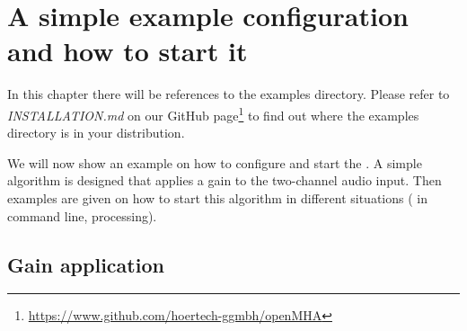 
\section{A simple example configuration and how to start it}%
\label{sec:scenarios}%
%
%
%
In this chapter there will be references to the \mha{} examples directory.
Please refer to \emph{INSTALLATION.md} on our GitHub page\footnote{\url{https://www.github.com/hoertech-ggmbh/openMHA}} to find out where the
examples directory is in your \mha{} distribution.

We will now show an example on how to configure and start the
\mha{}. A simple algorithm is designed that applies a gain to the two-channel audio input.
Then examples are given on how to start this algorithm in different situations (\mhad{} in command line, \Matlab{} processing).

\subsection{Gain application}%
\label{sec:dyncmp}%

